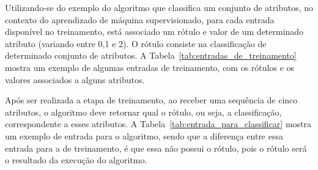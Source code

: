 Utilizando-se do exemplo do algoritmo que classifica um conjunto de atributos,
no contexto do aprendizado de máquina supervisionado, para cada entrada
disponível no treinamento, está associado um rótulo e valor de um determinado
atributo (variando entre 0,1 e 2). O rótulo consiste na classificação de
determinado conjunto de atributos. A Tabela~\ref{tab:entradas_de_treinamento}
mostra um exemplo de algumas entradas de treinamento, com os rótulos e os
valores associados a alguns atributos.

\begin{table}[h]
\centering
{}
\caption{Entradas de treinamento para o aprendizado de máquina}
\label{tab:entradas_de_treinamento}
\end{table}

Após ser realizada a etapa de treinamento, ao receber uma sequência de cinco
atributos, o algoritmo deve retornar qual o rótulo, ou seja, a classificação,
correspondente a esses atributos. A Tabela~\ref{tab:entrada_para_classificar}
mostra um exemplo de entrada para o algoritmo, sendo que a diferença entre
essa entrada para a de treinamento, é que essa não possui o rótulo, pois o rótulo será o resultado
da execução do algoritmo.

\begin{table}[h]
\centering
{}
\caption{Entrada de dados para o algoritmo determinar o rótulo}
\label{tab:entrada_para_classificar}
\end{table}


